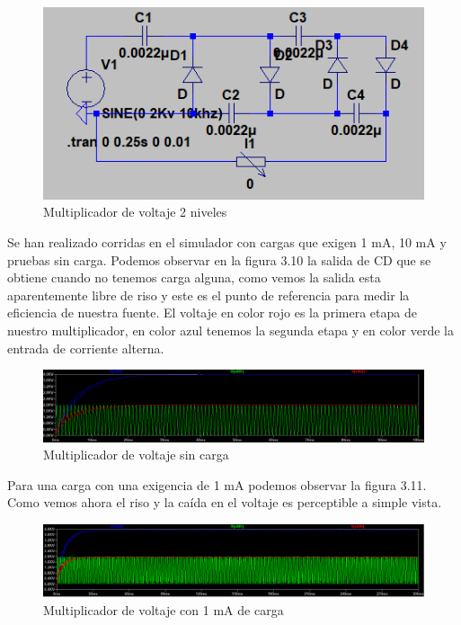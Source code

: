 \begin{figure}[H]
\centering
\includegraphics[width=12cm]{Capitulo3/figs/multi.png}
\caption{Multiplicador de voltaje 2 niveles}
\end{figure}

Se han realizado corridas en el simulador con cargas que exigen 1 mA, 10 mA y pruebas sin carga. Podemos observar en la figura 3.10 la salida de CD que se obtiene cuando no tenemos carga alguna, como vemos la salida esta aparentemente libre de riso y este es el punto de referencia para medir la eficiencia de nuestra fuente. El voltaje en color rojo es la primera etapa de nuestro multiplicador, en color azul tenemos la segunda etapa y en color verde la entrada de corriente alterna. 

\begin{figure}[H]
\centering
\includegraphics[width=12cm]{Capitulo3/figs/4kv.png}
\caption{Multiplicador de voltaje sin carga}
\end{figure}


Para una carga con una exigencia de 1 mA podemos observar la figura 3.11. Como vemos ahora el riso y la caída en el voltaje es perceptible a simple vista.


\begin{figure}[H]
\centering
\includegraphics[width=12cm]{Capitulo3/figs/1ma.png}
\caption{Multiplicador de voltaje con 1 mA de carga}
\end{figure}

